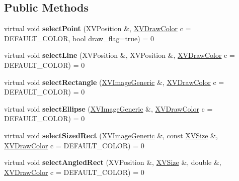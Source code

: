 \subsection*{Public Methods}
\begin{CompactItemize}
\item 
\label{XVInteractive_a0}
\hypertarget{class_XVInteractive_a0}{
virtual void {\bf select\-Point} (XVPosition \&, \hyperlink{class_XVDrawColor}{XVDraw\-Color} c = DEFAULT\_\-COLOR, bool draw\_\-flag=true) = 0}

\item 
\label{XVInteractive_a1}
\hypertarget{class_XVInteractive_a1}{
virtual void {\bf select\-Line} (XVPosition \&, XVPosition \&, \hyperlink{class_XVDrawColor}{XVDraw\-Color} c = DEFAULT\_\-COLOR) = 0}

\item 
\label{XVInteractive_a2}
\hypertarget{class_XVInteractive_a2}{
virtual void {\bf select\-Rectangle} (\hyperlink{class_XVImageGeneric}{XVImage\-Generic} \&, \hyperlink{class_XVDrawColor}{XVDraw\-Color} c = DEFAULT\_\-COLOR) = 0}

\item 
\label{XVInteractive_a3}
\hypertarget{class_XVInteractive_a3}{
virtual void {\bf select\-Ellipse} (\hyperlink{class_XVImageGeneric}{XVImage\-Generic} \&, \hyperlink{class_XVDrawColor}{XVDraw\-Color} c = DEFAULT\_\-COLOR) = 0}

\item 
\label{XVInteractive_a4}
\hypertarget{class_XVInteractive_a4}{
virtual void {\bf select\-Sized\-Rect} (\hyperlink{class_XVImageGeneric}{XVImage\-Generic} \&, const \hyperlink{class_XVSize}{XVSize} \&, \hyperlink{class_XVDrawColor}{XVDraw\-Color} c = DEFAULT\_\-COLOR) = 0}

\item 
\label{XVInteractive_a5}
\hypertarget{class_XVInteractive_a5}{
virtual void {\bf select\-Angled\-Rect} (XVPosition \&, \hyperlink{class_XVSize}{XVSize} \&, double \&, \hyperlink{class_XVDrawColor}{XVDraw\-Color} c = DEFAULT\_\-COLOR) = 0}


\end{CompactItemize}
